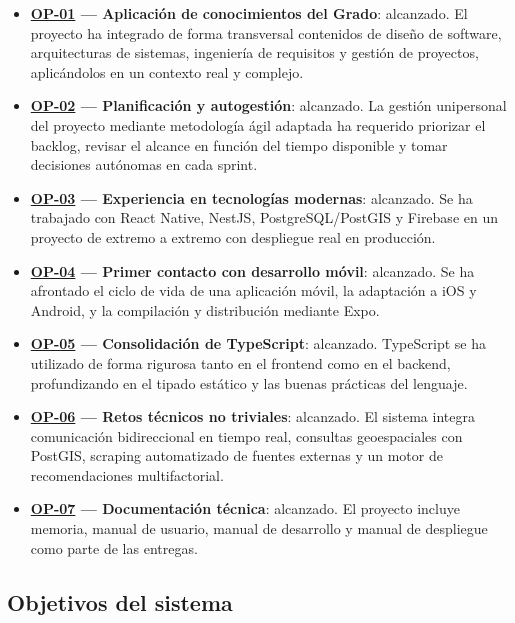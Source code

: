 \begin{itemize}
    \item \textbf{\hyperref[op:01]{OP-01} --- Aplicación de conocimientos del Grado}: alcanzado. El proyecto ha integrado de forma transversal contenidos de diseño de software, arquitecturas de sistemas, ingeniería de requisitos y gestión de proyectos, aplicándolos en un contexto real y complejo.

    \item \textbf{\hyperref[op:02]{OP-02} --- Planificación y autogestión}: alcanzado. La gestión unipersonal del proyecto mediante metodología ágil adaptada ha requerido priorizar el backlog, revisar el alcance en función del tiempo disponible y tomar decisiones autónomas en cada sprint.

    \item \textbf{\hyperref[op:03]{OP-03} --- Experiencia en tecnologías modernas}: alcanzado. Se ha trabajado con React Native, NestJS, PostgreSQL/PostGIS y Firebase en un proyecto de extremo a extremo con despliegue real en producción.

    \item \textbf{\hyperref[op:04]{OP-04} --- Primer contacto con desarrollo móvil}: alcanzado. Se ha afrontado el ciclo de vida de una aplicación móvil, la adaptación a iOS y Android, y la compilación y distribución mediante Expo.

    \item \textbf{\hyperref[op:05]{OP-05} --- Consolidación de TypeScript}: alcanzado. TypeScript se ha utilizado de forma rigurosa tanto en el frontend como en el backend, profundizando en el tipado estático y las buenas prácticas del lenguaje.

    \item \textbf{\hyperref[op:06]{OP-06} --- Retos técnicos no triviales}: alcanzado. El sistema integra comunicación bidireccional en tiempo real, consultas geoespaciales con PostGIS, scraping automatizado de fuentes externas y un motor de recomendaciones multifactorial.

    \item \textbf{\hyperref[op:07]{OP-07} --- Documentación técnica}: alcanzado. El proyecto incluye memoria, manual de usuario, manual de desarrollo y manual de despliegue como parte de las entregas.
\end{itemize}

\subsection{Objetivos del sistema}

